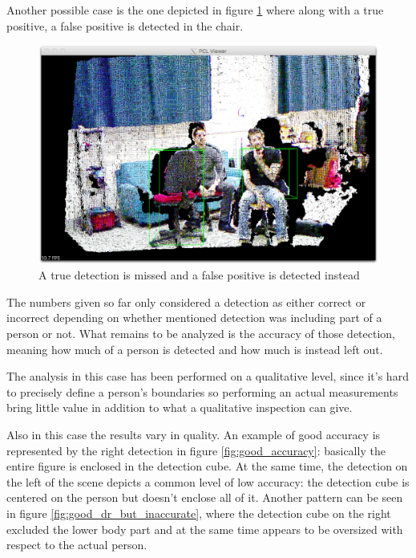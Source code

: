 \documentclass[a4paper,11pt,titlepage]{article}
\begin{document}
Another possible case is the one depicted in figure
\ref{fig:mixed_true_false_positives} where along with a true positive, a
false positive is detected in the chair.

\begin{figure}[h]
  \centering
  \includegraphics[scale=0.2]{mixed_true_false_positives.png}
  \caption{A true detection is missed and a false positive is detected instead}
  \label{fig:mixed_true_false_positives}
\end{figure}

The numbers given so far only considered a detection as either correct or
incorrect depending on whether mentioned detection was including part of a
person or not. What remains to be analyzed is the accuracy of those detection,
meaning how much of a person is detected and how much is instead left out.

The analysis in this case has been performed on a qualitative level, since it's
hard to precisely define a person's boundaries so performing an actual
measurements bring little value in addition to what a qualitative inspection can
give.

Also in this case the results vary in quality. An example of good accuracy is
represented by the right detection in figure \ref{fig:good_accuracy}: basically
the entire figure is enclosed in the detection cube. At the same time, the
detection on the left of the scene depicts a common level of low accuracy: the
detection cube is centered on the person but doesn't enclose all of it. Another
pattern can be seen in figure \ref{fig:good_dr_but_inaccurate}, where the
detection cube on the right excluded the lower body part and at the same time
appears to be oversized with respect to the actual person.
\end{document}
